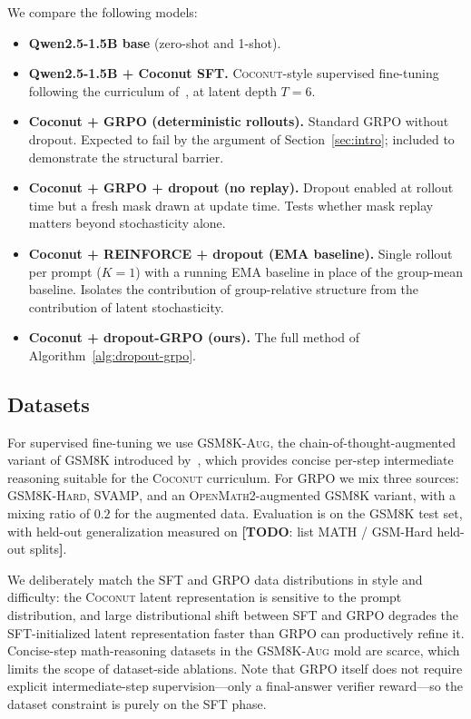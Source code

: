 \documentclass[11pt]{article}
\theoremstyle{definition}
\theoremstyle{remark}
\newcommand{\answerTODO}[1][]{{\color{red}\textbf{[TODO}#1\textbf{]}}}
\begin{document}
We compare the following models:
\begin{itemize}[topsep=2pt,itemsep=2pt,leftmargin=*]
\item \textbf{Qwen2.5-1.5B base} (zero-shot and 1-shot).
\item \textbf{Qwen2.5-1.5B + Coconut SFT.}  \textsc{Coconut}-style
      supervised fine-tuning following the curriculum
      of~\citet{hao2024coconut}, at latent depth $T = 6$.
\item \textbf{Coconut + GRPO (deterministic rollouts).}  Standard
      GRPO without dropout.  Expected to fail by the argument of
      Section~\ref{sec:intro}; included to demonstrate the structural
      barrier.
\item \textbf{Coconut + GRPO + dropout (no replay).}  Dropout enabled
      at rollout time but a fresh mask drawn at update time.  Tests
      whether mask replay matters beyond stochasticity alone.
\item \textbf{Coconut + REINFORCE + dropout (EMA baseline).}  Single
      rollout per prompt ($K = 1$) with a running EMA baseline in
      place of the group-mean baseline.  Isolates the contribution of
      group-relative structure from the contribution of latent
      stochasticity.
\item \textbf{Coconut + dropout-GRPO (ours).}  The full method of
      Algorithm~\ref{alg:dropout-grpo}.
\end{itemize}

\subsection{Datasets}
\label{sec:setup-data}

For supervised fine-tuning we use \textsc{GSM8K-Aug}, the
chain-of-thought-augmented variant of \textsc{GSM8K} introduced
by~\citet{hao2024coconut}, which provides concise per-step
intermediate reasoning suitable for the \textsc{Coconut} curriculum.
For GRPO we mix three sources: \textsc{GSM8K-Hard}, \textsc{SVAMP},
and an \textsc{OpenMath2}-augmented \textsc{GSM8K} variant, with a
mixing ratio of $0.2$ for the augmented data.  Evaluation is on the
\textsc{GSM8K} test set, with held-out generalization measured on
\answerTODO[: list MATH / GSM-Hard held-out splits].

We deliberately match the SFT and GRPO data distributions in style and
difficulty: the \textsc{Coconut} latent representation is sensitive
to the prompt distribution, and large distributional shift between
SFT and GRPO degrades the SFT-initialized latent representation
faster than GRPO can productively refine it.  Concise-step
math-reasoning datasets in the \textsc{GSM8K-Aug} mold are scarce,
which limits the scope of dataset-side ablations.  Note that GRPO
itself does not require explicit intermediate-step supervision---only
a final-answer verifier reward---so the dataset constraint is purely
on the SFT phase.
\end{document}
